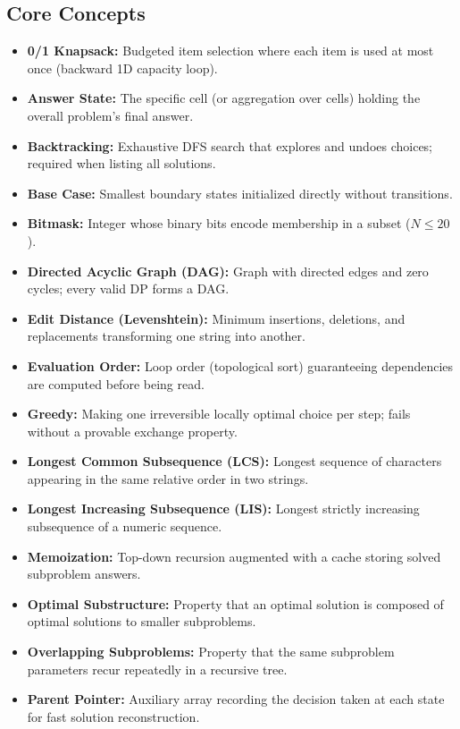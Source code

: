 \documentclass[11pt,a4paper]{article}
\theoremstyle{definition}
\begin{document}
\subsection*{Core Concepts}
\begin{itemize}
    \item \textbf{0/1 Knapsack:} Budgeted item selection where each item is used at most once (backward 1D capacity loop).
    \item \textbf{Answer State:} The specific cell (or aggregation over cells) holding the overall problem's final answer.
    \item \textbf{Backtracking:} Exhaustive DFS search that explores and undoes choices; required when listing all solutions.
    \item \textbf{Base Case:} Smallest boundary states initialized directly without transitions.
    \item \textbf{Bitmask:} Integer whose binary bits encode membership in a subset ($N \le 20$).
    \item \textbf{Directed Acyclic Graph (DAG):} Graph with directed edges and zero cycles; every valid DP forms a DAG.
    \item \textbf{Edit Distance (Levenshtein):} Minimum insertions, deletions, and replacements transforming one string into another.
    \item \textbf{Evaluation Order:} Loop order (topological sort) guaranteeing dependencies are computed before being read.
    \item \textbf{Greedy:} Making one irreversible locally optimal choice per step; fails without a provable exchange property.
    \item \textbf{Longest Common Subsequence (LCS):} Longest sequence of characters appearing in the same relative order in two strings.
    \item \textbf{Longest Increasing Subsequence (LIS):} Longest strictly increasing subsequence of a numeric sequence.
    \item \textbf{Memoization:} Top-down recursion augmented with a cache storing solved subproblem answers.
    \item \textbf{Optimal Substructure:} Property that an optimal solution is composed of optimal solutions to smaller subproblems.
    \item \textbf{Overlapping Subproblems:} Property that the same subproblem parameters recur repeatedly in a recursive tree.
    \item \textbf{Parent Pointer:} Auxiliary array recording the decision taken at each state for fast solution reconstruction.

\end{itemize}
\end{document}
